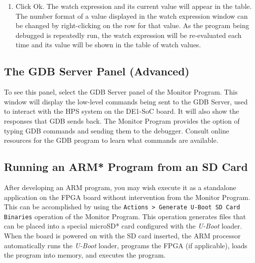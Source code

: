 \documentclass[11pt, twoside, pdftex]{article}
\begin{document}
\begin{enumerate}
\item Click \textsf{Ok}. The watch expression and its current
value will appear in the table. The number format of a value
displayed in the watch expression window can be changed by
right-clicking on the row for that value.  
As the program being debugged is repeatedly run, 
the watch expression will be re-evaluated each time and its value
will be shown in the table of watch values.
\end{enumerate}

\subsection{The GDB Server Panel (Advanced)}
\label{sec:9.4}

To see this panel, select the {\sf GDB Server} panel of the
Monitor Program. This window will display the low-level commands
being sent to the GDB Server, used to interact with the HPS
system on the DE1-SoC board. It will also show the responses that GDB sends back. The Monitor Program provides the option
of typing GDB commands and sending them to the debugger. 
Consult online resources for the GDB program to learn what
commands are available.

\subsection{Running an ARM* Program from an SD Card}
\label{sec:baremetal_sd_card}

After developing an ARM program, you may wish execute it as a standalone application on the FPGA board without intervention from the Monitor Program. %
This can be accomplished by using the \texttt{Actions > Generate U-Boot SD Card Binaries} operation of the Monitor Program. This operation generates files that can be placed into a special microSD* card configured with the \textit{U-Boot} loader. When the board is powered on with the SD card inserted, the ARM processor automatically runs the \textit{U-Boot} loader, programs the FPGA (if applicable), loads the program into memory, and executes the program.%


\end{document}
